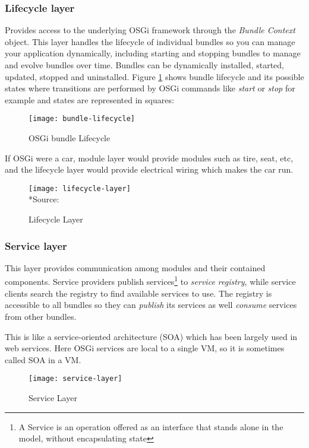 \subsubsection{Lifecycle layer}
Provides access to the underlying OSGi framework through the \emph{Bundle Context} object. This layer handles the lifecycle of individual bundles so you can manage your application dynamically, including starting and stopping bundles to manage and evolve bundles over time. Bundles can be dynamically installed, started, updated, stopped and uninstalled. Figure \ref{bundle lifecycle} shows bundle lifecycle and its possible states where transitions are performed by OSGi commands like \emph{start} or \emph{stop} for example and states are represented in squares:

\begin{figure}[h]
\label{bundle lifecycle}
\caption{OSGi bundle Lifecycle}
\centering
\texttt{[image: bundle-lifecycle]}
\end{figure}

If OSGi were a car, module layer would provide modules such as tire, seat, etc, and the lifecycle layer would provide electrical wiring which makes the car run. 

\begin{figure}[h]
\label{lifecycle layer}
\caption{Lifecycle Layer}
\centering
\texttt{[image: lifecycle-layer]}
\\*Source: \cite{conceptual layers 2011}
\end{figure}

\subsubsection{Service layer}
This layer provides communication among modules and their contained components. Service providers publish services\footnote{A Service is an operation offered as an interface that stands alone in the model, without encapsulating state\citep{Evans 2003}} to \emph{service registry}, while service clients search the registry to find available services to use. The registry is accessible to all bundles so they can \emph{publish} its services as well \emph{consume} services from other bundles.  

This is like a service-oriented architecture (SOA) which has been largely used in web services. Here OSGi services are local to a single VM, so it is sometimes called SOA in a VM.

\begin{figure}[h]
\label{service layer}
\caption{Service Layer}
\centering
\texttt{[image: service-layer]}
\end{figure}



